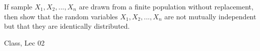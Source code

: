 \begin{ex}
If sample $X_1, X_2, ..., X_n$ are drawn from  a finite population without replacement, then show that the random variables $X_1, X_2, ...,X_n$ are not mutually independent but that they are identically distributed.
\end{ex}
\begin{source}
Class, Lec 02 
\end{source}
